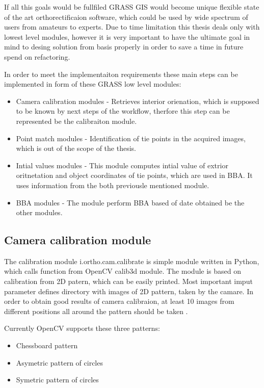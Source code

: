 \documentclass[a4paper,12pt]{report}
\begin{document}
If all this goals would be fullfiled GRASS GIS would become unique flexible state of the art orthorectificaion 
software, which could be used by wide spectrum of users from amateurs to experts.
Due to time limitation this thesis deals only with lowest level modules, however it is very important to have 
the ultimate goal in mind to desing solution from basis properly in order to save a time in future spend 
on refactoring.

In order to meet the implementaiton requirements these main steps can be implemented in form 
of these GRASS low level modules:

\begin{itemize}
\item Camera calibration modules - Retrieves interior orienation, which is supposed to be known by 
next steps of the workflow, therfore this step can be represented be the calibraiton module.
\item Point match modules - Identification of tie points in the acquired images, which is out of the 
scope of the thesis.
\item Intial values modules - This module computes intial value of extrior oritnetation and 
object coordinates of tie points, which are used in BBA. It uses information from the both
previousle mentioned module.
\item BBA modules - The module perform BBA based of date obtained be the other modules.
\end{itemize}


\subsection{Camera calibration module}

The calibration module i.ortho.cam.calibrate is simple module written in Python, which calls
function from OpenCV calib3d module. The module is based on calibration from 2D patern, which can 
be easily printed. Most important imput parameter defines directory with images of 2D pattern, 
taken by the camare. In order to obtain good results of camera calibraion, at least 10 images 
from different positions all around the pattern should be taken \cite{camera_calibration2013opencv}.

Currently OpenCV supports these three patterns:
\begin{itemize}
\item Chessboard pattern 
\item Asymetric pattern of circles
\item Symetric pattern of circles
\end{itemize}
\end{document}
